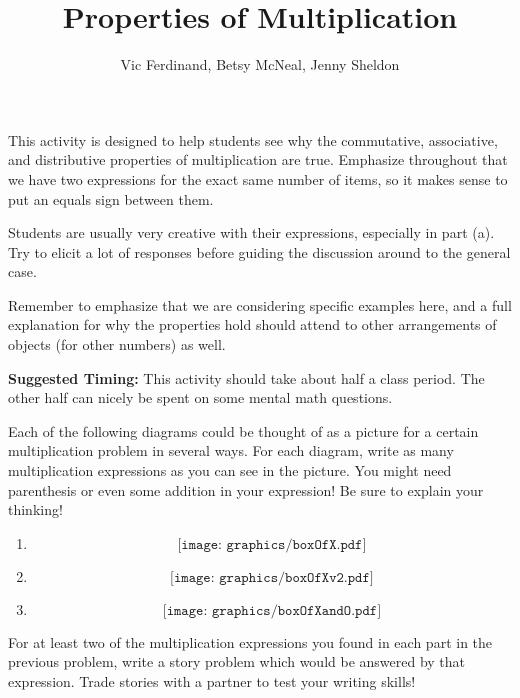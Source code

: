 \documentclass{ximera}
\title{Properties of Multiplication}
\author{Vic Ferdinand, Betsy McNeal, Jenny Sheldon}
\begin{document}
\begin{abstract} \end{abstract}
\maketitle

\begin{instructorIntro}
This activity is designed to help students see why the commutative, associative, and distributive properties of multiplication are true.  Emphasize throughout that we have two expressions for the exact same number of items, so it makes sense to put an equals sign between them.  

Students are usually very creative with their expressions, especially in part (a).  Try to elicit a lot of responses before guiding the discussion around to the general case.  

Remember to emphasize that we are considering specific examples here, and a full explanation for why the properties hold should attend to other arrangements of objects (for other numbers) as well.

{\bf Suggested Timing:} This activity should take about half a class period.  The other half can nicely be spent on some mental math questions.
\end{instructorIntro}

\begin{problem}

 Each of the following diagrams could be thought of as a picture for a certain multiplication problem in several ways.  For each diagram, write as many multiplication expressions as you can see in the picture.  You might need parenthesis or even some addition in your expression!  Be sure to explain your thinking!
\begin{enumerate}
    \item \[ \texttt{[image: graphics/boxOfX.pdf]} \]
    \item \[ \texttt{[image: graphics/boxOfXv2.pdf]} \]
    \item \[ \texttt{[image: graphics/boxOfXandO.pdf]} \]
\end{enumerate}
\end{problem}

\begin{problem}
 For at least two of the multiplication expressions you found in each part in the previous problem, write a story problem which would be answered by that expression.  Trade stories with a partner to test your writing skills!
\end{problem}
\end{document}
